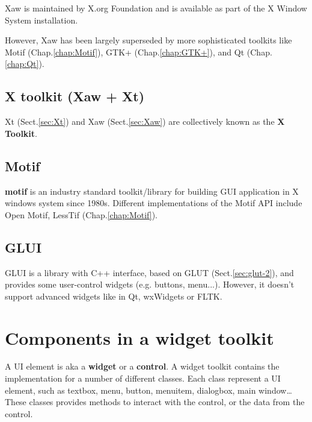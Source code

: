 Xaw is maintained by X.org Foundation and is available as part of the X Window
System installation. 

However, Xaw has been largely superseded by more sophisticated toolkits like
Motif (Chap.\ref{chap:Motif}), GTK+ (Chap.\ref{chap:GTK+}), and Qt (Chap.\ref{chap:Qt}).  

\subsection{X toolkit (Xaw + Xt)}
\label{sec:X_toolkit}
 
Xt (Sect.\ref{sec:Xt}) and Xaw (Sect.\ref{sec:Xaw}) are collectively known as
the {\bf X Toolkit}.


\subsection{Motif}
\label{sec:Motif}

{\bf motif} is an industry standard toolkit/library for building GUI application
in X windows system since 1980s. Different implementations of the Motif API include Open
Motif, LessTif (Chap.\ref{chap:Motif}).  

\subsection{GLUI}
\label{sec:glui}

GLUI is a library with C++ interface, based on GLUT (Sect.\ref{sec:glut-2}), and
provides some user-control widgets (e.g. buttons, menu...). However, it doesn't
support advanced widgets like in Qt, wxWidgets or FLTK. 




\section{Components in a widget toolkit}
\label{sec:UI-components-widget-tookit}

A UI element is aka a {\bf widget} or a {\bf control}.
A widget toolkit contains the implementation for a number of different classes.
Each class represent a UI element, such as textbox, menu, button, menuitem,
dialogbox, main window\ldots
These classes provides methods to interact with the control, or the data from
the control.

